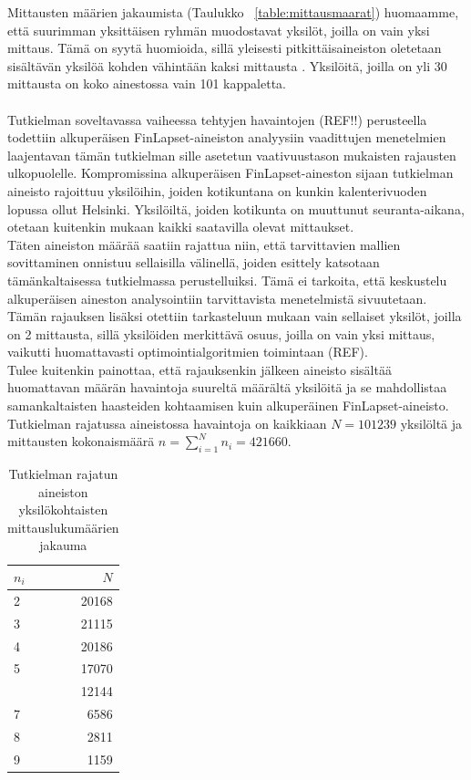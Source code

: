 \documentclass[finnish]{docopts}
\begin{document}
Mittausten määrien jakaumista (Taulukko ~\ref{table:mittausmaarat}) huomaamme, että suurimman yksittäisen ryhmän muodostavat yksilöt, joilla on vain yksi mittaus. Tämä on syytä huomioida, sillä yleisesti pitkittäisaineiston oletetaan sisältävän yksilöä kohden vähintään kaksi mittausta \cite{west14}. Yksilöitä, joilla on yli 30 mittausta on koko ainestossa vain 101 kappaletta. \\\\

Tutkielman soveltavassa vaiheessa tehtyjen havaintojen (REF!!) perusteella todettiin alkuperäisen FinLapset-aineiston analyysiin vaadittujen menetelmien laajentavan tämän tutkielman sille asetetun vaativuustason mukaisten rajausten ulkopuolelle. Kompromissina alkuperäisen FinLapset-aineston sijaan tutkielman aineisto rajoittuu yksilöihin, joiden kotikuntana on kunkin kalenterivuoden lopussa ollut Helsinki. Yksilöiltä, joiden kotikunta on muuttunut seuranta-aikana, otetaan kuitenkin mukaan kaikki saatavilla olevat mittaukset.\\

Täten aineiston määrää saatiin rajattua niin, että tarvittavien mallien sovittaminen onnistuu sellaisilla välinellä, joiden esittely katsotaan tämänkaltaisessa tutkielmassa perustelluiksi. Tämä ei tarkoita, että keskustelu alkuperäisen aineston analysointiin tarvittavista menetelmistä sivuutetaan.\\

Tämän rajauksen lisäksi otettiin tarkasteluun mukaan vain sellaiset yksilöt, joilla on 2 mittausta, sillä yksilöiden merkittävä osuus, joilla on vain yksi mittaus, vaikutti huomattavasti optimointialgoritmien toimintaan (REF).\\

Tulee kuitenkin painottaa, että rajauksenkin jälkeen aineisto sisältää huomattavan määrän havaintoja suureltä määrältä yksilöitä ja se mahdollistaa samankaltaisten haasteiden kohtaamisen kuin alkuperäinen FinLapset-aineisto.\\

Tutkielman rajatussa aineistossa havaintoja on kaikkiaan $N = 101239$ yksilöltä ja mittausten kokonaismäärä $n = \sum\limits_{i = 1}^{N} n_{i} = 421660$. \\

\begin{table}[ht]
\centering
\begin{tabular}{lr}
\toprule
$n_i$ & $N$\\
\midrule
2 & 20168\\
3 & 21115\\
4 & 20186\\
5 & 17070\\
\addlinespace
6 & 12144\\
7 & 6586\\
8 & 2811\\
9 & 1159\\
\bottomrule
\end{tabular}
\caption{Tutkielman rajatun aineiston yksilökohtaisten mittauslukumäärien jakauma}
\label{table:mittausmaaratrajattu}
\end{table}
\end{document}
